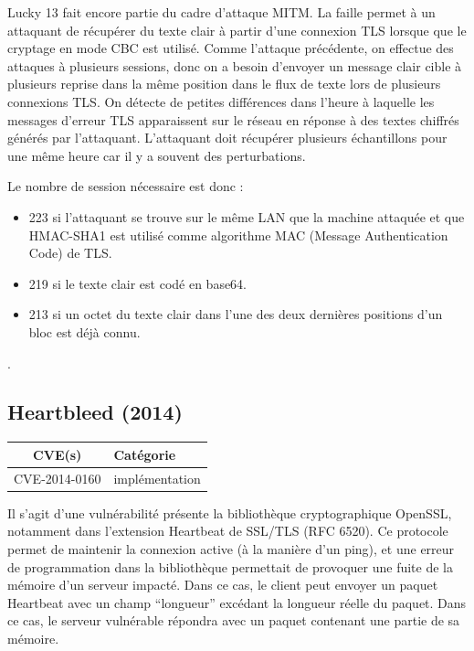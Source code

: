 \vspace{1em}

Lucky 13 fait encore partie du cadre d'attaque MITM. La faille permet à un attaquant de récupérer du texte clair à partir d'une connexion TLS lorsque que le cryptage en mode CBC est utilisé. Comme l'attaque précédente, on effectue des attaques à plusieurs sessions, donc on a besoin d'envoyer un message clair cible à plusieurs reprise dans la même position dans le flux de texte lors de plusieurs connexions TLS. On détecte de petites différences dans l'heure à laquelle les messages d'erreur TLS apparaissent sur le réseau en réponse à des textes chiffrés générés par l'attaquant. L'attaquant doit récupérer plusieurs échantillons pour une même heure car il y a souvent des perturbations.

Le nombre de session nécessaire est donc :

\begin{itemize}
\item 223 si l'attaquant se trouve sur le même LAN que la machine attaquée et que HMAC-SHA1 est utilisé comme algorithme MAC (Message Authentication Code) de TLS.
\item 219 si le texte clair est codé en base64.
\item 213 si un octet du texte clair dans l'une des deux dernières positions d'un bloc est déjà connu.
\end{itemize}
\cite{lucky13}.




\subsection{Heartbleed (2014)}

\begin{tabularx}{0.96\textwidth}{|c|X|}
  \hline
  \textbf{CVE(s)} & \textbf{Catégorie} \\
  \hline
  CVE-2014-0160 & implémentation \\
  \hline
\end{tabularx}

\vspace{1em}

Il s'agit d'une vulnérabilité présente la bibliothèque cryptographique OpenSSL, notamment dans l'extension Heartbeat de SSL/TLS (RFC 6520). Ce protocole permet de maintenir la connexion active (à la manière d'un ping), et une erreur de programmation dans la bibliothèque permettait de provoquer une fuite de la mémoire d'un serveur impacté. Dans ce cas, le client peut envoyer un paquet Heartbeat avec un champ ``longueur'' excédant la longueur réelle du paquet. Dans ce cas, le serveur vulnérable répondra avec un paquet contenant une partie de sa mémoire.

